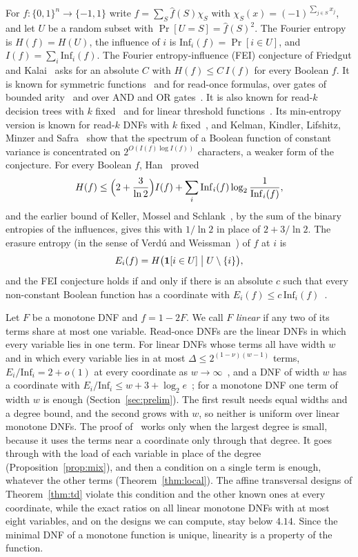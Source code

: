 \documentclass[11pt]{amsart}
\theoremstyle{remark}
\newcommand{\Inf}{\mathrm{Inf}}
\begin{document}
For $f\colon\{0,1\}^n\to\{-1,1\}$ write $f=\sum_S\hat f(S)\chi_S$ with $\chi_S(x)=(-1)^{\sum_{j\in S}x_j}$, and let $U$
be a random subset with $\Pr[U=S]=\hat f(S)^2$. The Fourier entropy is $H(f)=H(U)$, the influence of $i$ is
$\Inf_i(f)=\Pr[i\in U]$, and $I(f)=\sum_i\Inf_i(f)$. The Fourier entropy-influence (FEI) conjecture of Friedgut and
Kalai~\cite{FK96} asks for an absolute $C$ with $H(f)\le C\,I(f)$ for every Boolean $f$. It is known for symmetric
functions~\cite{OWZ} and for read-once formulas, over gates of bounded arity~\cite{OT13} and over AND and OR
gates~\cite{CKLS}. It is also known for read-$k$ decision trees with $k$ fixed~\cite{WWW} and for linear threshold
functions~\cite{ShmLTF}. Its min-entropy version is known for
read-$k$ DNFs with $k$ fixed~\cite{Shalev,ACKSW}, and Kelman, Kindler, Lifshitz, Minzer and Safra~\cite{KKLMS} show
that the spectrum of a Boolean function of constant variance is concentrated on $2^{O(I(f)\log I(f))}$ characters,
a weaker form of the conjecture. For every Boolean $f$, Han~\cite{Han} proved
\[
H(f)\le\Bigl(2+\frac{3}{\ln 2}\Bigr)I(f)+\sum_i\Inf_i(f)\log_2\frac{1}{\Inf_i(f)},
\]
and the earlier bound of Keller, Mossel and Schlank~\cite[Claim~4.1]{KMS}, by the sum of the binary entropies of the influences, gives this with $1/\ln 2$ in place of $2+3/\ln 2$. The erasure entropy (in the sense of Verd\'u and
Weissman~\cite{VW08}) of $f$ at $i$ is
\[
E_i(f)=H\bigl(\mathbf 1[i\in U]\bigm| U\setminus\{i\}\bigr),
\]
and the FEI conjecture holds if and only if there is an absolute $c$ such that every non-constant Boolean function has
a coordinate with $E_i(f)\le c\,\Inf_i(f)$~\cite{Shm1}.

Let $F$ be a monotone DNF and $f=1-2F$. We call $F$ \emph{linear} if any two of its terms share at most one variable.
Read-once DNFs are the linear DNFs in which every variable lies in one term. For linear DNFs whose terms all have width
$w$ and in which every variable lies in at most $\Delta\le2^{(1-\nu)(w-1)}$ terms, $E_i/\Inf_i=2+o(1)$ at every coordinate
as $w\to\infty$~\cite[Theorem~1]{Shm6}, and a DNF of width $w$ has a coordinate with $E_i/\Inf_i\le w+3+\log_2e$~\cite{Shm3};
for a monotone DNF one term of width $w$ is enough (Section~\ref{sec:prelim}). The first result needs equal widths and
a degree bound, and the second grows with $w$, so neither is uniform over linear monotone DNFs. The proof
of~\cite{Shm6} works only when the largest degree is small, because it uses the terms near a coordinate only through
that degree. It goes through with the load of each
variable in place of the degree (Proposition~\ref{prop:mix}), and then a condition on a single term is enough, whatever
the other terms (Theorem~\ref{thm:local}). The affine transversal designs of Theorem~\ref{thm:td} violate this condition
and the other known ones at every coordinate, while the exact ratios on all linear monotone DNFs with at most eight
variables, and on the designs we can compute, stay below $4.14$. Since the minimal DNF
of a monotone function is unique, linearity is a property of the function.
\end{document}
